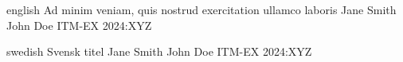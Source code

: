 

\maketitlepage
    {english}
    {Ad minim veniam, quis nostrud exercitation ullamco laboris}
    {Jane Smith}
    {John Doe}
    {ITM-EX 2024:XYZ}

\maketitlepage
    {swedish}
    {Svensk titel}
    {Jane Smith}
    {John Doe}
    {ITM-EX 2024:XYZ}